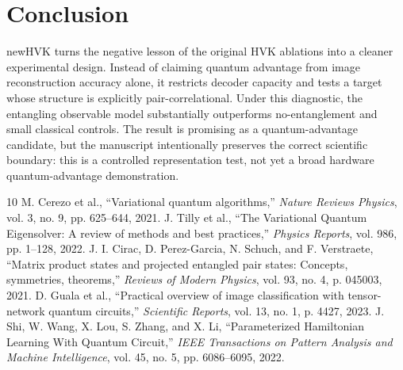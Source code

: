 \documentclass[journal]{IEEEtran}
\begin{document}
\section{Conclusion}
newHVK turns the negative lesson of the original HVK ablations into a cleaner experimental design. Instead of claiming quantum advantage from image reconstruction accuracy alone, it restricts decoder capacity and tests a target whose structure is explicitly pair-correlational. Under this diagnostic, the entangling observable model substantially outperforms no-entanglement and small classical controls. The result is promising as a quantum-advantage candidate, but the manuscript intentionally preserves the correct scientific boundary: this is a controlled representation test, not yet a broad hardware quantum-advantage demonstration.

\begin{thebibliography}{10}
 M. Cerezo et al., ``Variational quantum algorithms,'' \textit{Nature Reviews Physics}, vol. 3, no. 9, pp. 625--644, 2021.
 J. Tilly et al., ``The Variational Quantum Eigensolver: A review of methods and best practices,'' \textit{Physics Reports}, vol. 986, pp. 1--128, 2022.
 J. I. Cirac, D. Perez-Garcia, N. Schuch, and F. Verstraete, ``Matrix product states and projected entangled pair states: Concepts, symmetries, theorems,'' \textit{Reviews of Modern Physics}, vol. 93, no. 4, p. 045003, 2021.
 D. Guala et al., ``Practical overview of image classification with tensor-network quantum circuits,'' \textit{Scientific Reports}, vol. 13, no. 1, p. 4427, 2023.
 J. Shi, W. Wang, X. Lou, S. Zhang, and X. Li, ``Parameterized Hamiltonian Learning With Quantum Circuit,'' \textit{IEEE Transactions on Pattern Analysis and Machine Intelligence}, vol. 45, no. 5, pp. 6086--6095, 2022.
\end{thebibliography}
\end{document}

